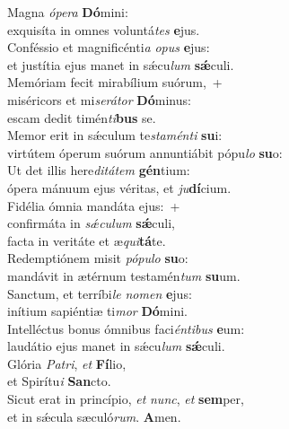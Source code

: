 \evenverse Magna \textit{ó}\textit{pe}\textit{ra} \textbf{Dó}mini:~\*\\
\evenverse exquisíta in omnes voluntá\textit{tes} \textbf{e}jus.\\
\oddverse Conféssio et magnificénti\textit{a} \textit{o}\textit{pus} \textbf{e}jus:~\*\\
\oddverse et justítia ejus manet in sǽcu\textit{lum} \textbf{sǽ}culi.\\
\evenverse Memóriam fecit mirabílium suórum,~+\\
\evenverse  miséricors et mi\textit{se}\textit{rá}\textit{tor} \textbf{Dó}minus:~\*\\
\evenverse escam dedit timén\textit{ti}\textbf{bus} se.\\
\oddverse Memor erit in sǽculum te\textit{sta}\textit{mén}\textit{ti} \textbf{su}i:~\*\\
\oddverse virtútem óperum suórum annuntiábit pópu\textit{lo} \textbf{su}o:\\
\evenverse Ut det illis here\textit{di}\textit{tá}\textit{tem} \textbf{gén}tium:~\*\\
\evenverse ópera mánuum ejus véritas, et \textit{ju}\textbf{dí}cium.\\
\oddverse Fidélia ómnia mandáta ejus:~+\\
\oddverse  confirmáta in \textit{sǽ}\textit{cu}\textit{lum} \textbf{sǽ}culi,~\*\\
\oddverse facta in veritáte et æ\textit{qui}\textbf{tá}te.\\
\evenverse Redemptiónem misit \textit{pó}\textit{pu}\textit{lo} \textbf{su}o:~\*\\
\evenverse mandávit in ætérnum testamén\textit{tum} \textbf{su}um.\\
\oddverse Sanctum, et terríbi\textit{le} \textit{no}\textit{men} \textbf{e}jus:~\*\\
\oddverse inítium sapiéntiæ ti\textit{mor} \textbf{Dó}mini.\\
\evenverse Intelléctus bonus ómnibus faci\textit{én}\textit{ti}\textit{bus} \textbf{e}um:~\*\\
\evenverse laudátio ejus manet in sǽcu\textit{lum} \textbf{sǽ}culi.\\
\oddverse Glória \textit{Pa}\textit{tri}, \textit{et} \textbf{Fí}lio,~\*\\
\oddverse et Spirítu\textit{i} \textbf{San}cto.\\
\evenverse Sicut erat in princípio, \textit{et} \textit{nunc}, \textit{et} \textbf{sem}per,~\*\\
\evenverse et in sǽcula sæculó\textit{rum}. \textbf{A}men.\\

